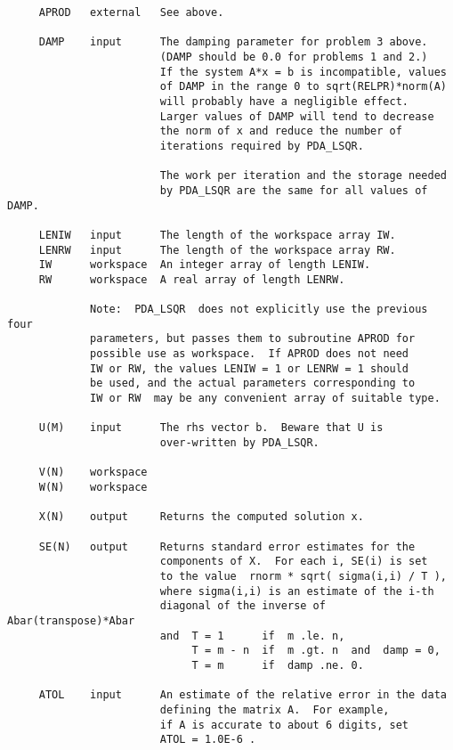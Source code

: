 \begin{verbatim}
     APROD   external   See above.

     DAMP    input      The damping parameter for problem 3 above.
                        (DAMP should be 0.0 for problems 1 and 2.)
                        If the system A*x = b is incompatible, values
                        of DAMP in the range 0 to sqrt(RELPR)*norm(A)
                        will probably have a negligible effect.
                        Larger values of DAMP will tend to decrease
                        the norm of x and reduce the number of
                        iterations required by PDA_LSQR.

                        The work per iteration and the storage needed
                        by PDA_LSQR are the same for all values of DAMP.

     LENIW   input      The length of the workspace array IW.
     LENRW   input      The length of the workspace array RW.
     IW      workspace  An integer array of length LENIW.
     RW      workspace  A real array of length LENRW.

             Note:  PDA_LSQR  does not explicitly use the previous four
             parameters, but passes them to subroutine APROD for
             possible use as workspace.  If APROD does not need
             IW or RW, the values LENIW = 1 or LENRW = 1 should
             be used, and the actual parameters corresponding to
             IW or RW  may be any convenient array of suitable type.

     U(M)    input      The rhs vector b.  Beware that U is
                        over-written by PDA_LSQR.

     V(N)    workspace
     W(N)    workspace

     X(N)    output     Returns the computed solution x.

     SE(N)   output     Returns standard error estimates for the
                        components of X.  For each i, SE(i) is set
                        to the value  rnorm * sqrt( sigma(i,i) / T ),
                        where sigma(i,i) is an estimate of the i-th
                        diagonal of the inverse of Abar(transpose)*Abar
                        and  T = 1      if  m .le. n,
                             T = m - n  if  m .gt. n  and  damp = 0,
                             T = m      if  damp .ne. 0.

     ATOL    input      An estimate of the relative error in the data
                        defining the matrix A.  For example,
                        if A is accurate to about 6 digits, set
                        ATOL = 1.0E-6 .


\end{verbatim}
